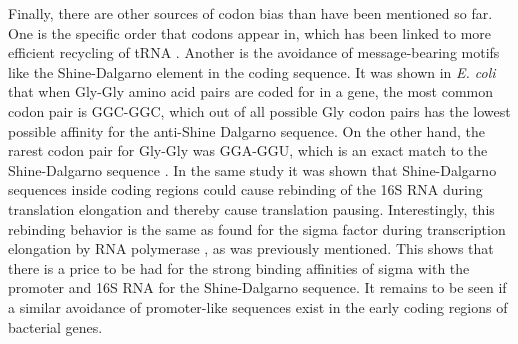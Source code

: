 Finally, there are other sources of codon bias than have been mentioned so far.
One is the specific order that codons appear in, which has been linked to more
efficient recycling of tRNA \cite{cannarozzi_role_2010}. Another is the
avoidance of message-bearing motifs like the Shine-Dalgarno element in the
coding sequence. It was shown in \textit{E. coli} that when Gly-Gly amino acid
pairs are coded for in a gene, the most common codon pair is GGC-GGC, which out
of all possible Gly codon pairs has the lowest possible affinity for the
anti-Shine Dalgarno sequence. On the other hand, the rarest codon pair for
Gly-Gly was GGA-GGU, which is an exact match to the Shine-Dalgarno sequence
\cite{li_anti-shine-dalgarno_2012}. In the same study it was shown that
Shine-Dalgarno sequences inside coding regions could cause rebinding of the
16S RNA during translation elongation and thereby cause translation pausing.
Interestingly, this rebinding behavior is the same as found for the sigma
factor during transcription elongation by RNA polymerase
\cite{mooney_sigma_2005}, as was previously mentioned. This shows that there is
a price to be had for the strong binding affinities of sigma with the promoter
and 16S RNA for the Shine-Dalgarno sequence. It remains to be seen if a similar
avoidance of promoter-like sequences exist in the early coding regions of
bacterial genes.
